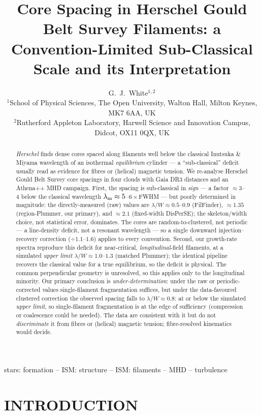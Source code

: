 \documentclass[usenatbib,twoside,twocolumn]{mnras}
\title{Core Spacing in Herschel Gould Belt Survey Filaments: a Convention-Limited Sub-Classical Scale and its Interpretation}
\author[G.~J.~White]{G.~J.~White$^{1,2}$\\
$^{1}$School of Physical Sciences, The Open University, Walton Hall, Milton Keynes, MK7 6AA, UK\\
$^{2}$Rutherford Appleton Laboratory, Harwell Science and Innovation Campus, Didcot, OX11 0QX, UK}
\begin{document}
\maketitle

\begin{abstract}
\textit{Herschel} finds dense cores spaced along filaments well below the classical Inutsuka \& Miyama wavelength of an isothermal \emph{equilibrium} cylinder --- a ``sub-classical'' deficit usually read as evidence for fibres or (helical) magnetic tension. We re-analyse Herschel Gould Belt Survey core spacings in four clouds with Gaia DR3 distances and an Athena++ MHD campaign. First, the spacing is sub-classical in \emph{sign} --- a factor $\approx3$--$4$ below the classical wavelength $\lambda_{\rm m}\approx5$--$6\times$FWHM --- but poorly determined in magnitude: the directly-measured (raw) values are $\lambda/W\approx0.5$--$0.9$ (FilFinder), $\approx1.35$ (region-Plummer, our primary), and $\approx2.1$ (fixed-width DisPerSE); the skeleton/width choice, not statistical error, dominates. The cores are random-to-clustered, not periodic --- a line-density deficit, not a resonant wavelength --- so a single downward injection--recovery correction ($\div1.1$--$1.6$) applies to every convention. Second, our growth-rate spectra reproduce this deficit for near-critical, \emph{longitudinal}-field filaments, at a simulated \emph{upper limit} $\lambda/W\approx1.0$--$1.3$ (matched Plummer); the identical pipeline recovers the classical value for a true equilibrium, so the deficit is physical. The common perpendicular geometry is unresolved, so this applies only to the longitudinal minority. Our primary conclusion is \emph{under-determination}: under the raw or periodic-corrected values single-filament fragmentation suffices, but under the data-favoured clustered correction the observed spacing falls to $\lambda/W\approx0.8$: at or below the simulated \emph{upper limit}, so single-filament fragmentation is at the edge of sufficiency (compression or coalescence could be needed). The data are consistent with it but do not \emph{discriminate} it from fibres or (helical) magnetic tension; fibre-resolved kinematics would decide.
\end{abstract}


\begin{keywords}
stars: formation -- ISM: structure -- ISM: filaments -- MHD -- turbulence
\end{keywords}

\section{INTRODUCTION}
\end{document}
